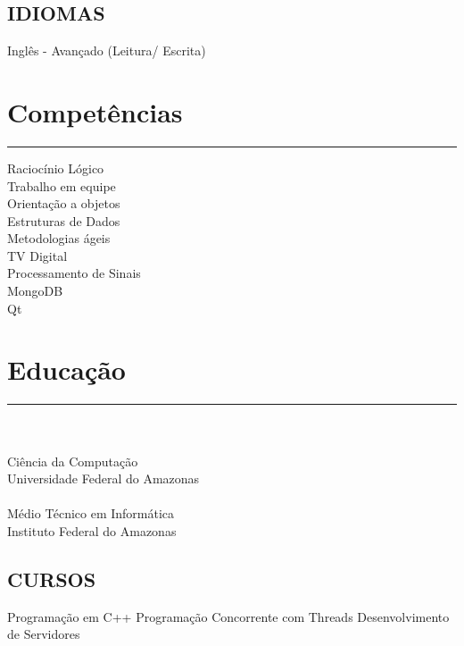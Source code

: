 \documentclass[]{rahulworld-resume}
\begin{document}
\begin{minipage}[t]{0.33\textwidth}
\subsection{IDIOMAS}
Inglês - Avançado (Leitura/ Escrita)
\sectionsep
\section{Competências}
\noindent\rule{5cm}{0.4pt}

Raciocínio Lógico\\
Trabalho em equipe\\
Orientação a objetos\\
Estruturas de Dados\\
Metodologias ágeis\\
TV Digital\\
Processamento de Sinais\\
MongoDB\\
Qt
\sectionsep
\section{Educação} 
\noindent\rule{5cm}{0.4pt}\\
\\
Ciência da Computação\\
Universidade Federal do Amazonas \\
\vspace{8pt}
\\
Médio Técnico em Informática\\
Instituto Federal do Amazonas\\
\vspace{8pt}
\subsection{CURSOS}
Programação em C++
Programação Concorrente com Threads
Desenvolvimento de Servidores
\sectionsep
%
%

\end{minipage} 
\hfill
\end{document}

